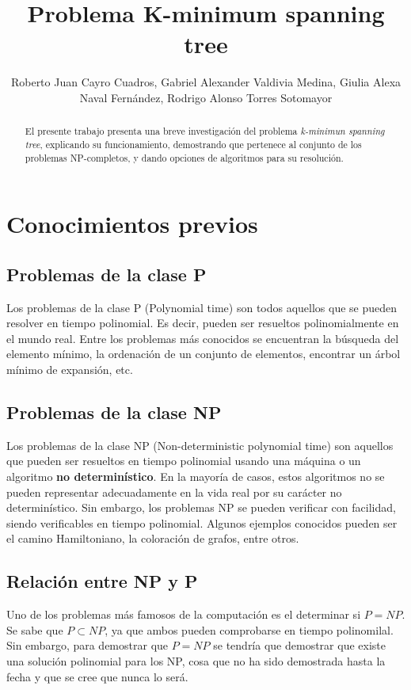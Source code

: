 \documentclass[spanish,12pt]{elsarticle}
\begin{document}
\begin{frontmatter}
\title{Problema K-minimum spanning tree}
\author{Roberto Juan Cayro Cuadros, Gabriel Alexander Valdivia Medina,
Giulia Alexa Naval Fernández, Rodrigo Alonso Torres Sotomayor}
\begin{abstract}
    El presente trabajo presenta una breve investigación del problema \textit{k-minimun spanning tree}, explicando su funcionamiento, demostrando que pertenece al conjunto de los problemas NP-completos, y dando opciones de algoritmos para su resolución.\\
\end{abstract}
\address{Universidad Católica San Pablo}

\end{frontmatter}


\section {Conocimientos previos}
\subsection{Problemas de la clase P}
Los problemas de la clase P (Polynomial time) son todos aquellos que se pueden resolver en tiempo polinomial. Es decir, pueden ser resueltos polinomialmente en el mundo real. Entre los problemas más conocidos se encuentran la búsqueda del elemento mínimo, la ordenación de un conjunto de elementos, encontrar un árbol mínimo de expansión, etc.


\subsection{Problemas de la clase NP}
Los problemas de la clase NP (Non-deterministic polynomial time) son aquellos que pueden ser resueltos en tiempo polinomial usando una máquina o un algoritmo \textbf{no determinístico}. En la mayoría de casos, estos algoritmos no se pueden representar adecuadamente en la vida real por su carácter no determinístico. Sin embargo, los problemas NP se pueden verificar con facilidad, siendo verificables en tiempo polinomial.
Algunos ejemplos conocidos pueden ser el camino Hamiltoniano, la coloración de grafos, entre otros.
\clearpage


\subsection{Relación entre NP y P}
Uno de los problemas más famosos de la computación es el determinar si $P = NP$. Se sabe que $P \subset NP$, ya que ambos pueden comprobarse en tiempo polinomilal. Sin embargo, para demostrar que $P=NP$ se tendría que demostrar que existe una solución polinomial para los NP, cosa que no ha sido demostrada hasta la fecha y que se cree que nunca lo será.
\end{document}
